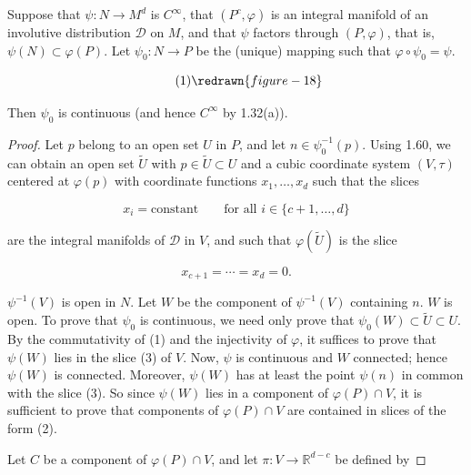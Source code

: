 \begin{theorem}\label{thm:1.62}
	Suppose that $\psi: N \to M^d$ is $C^\infty$, that $(P^c, \varphi)$ is an integral manifold of an involutive distribution $\mathcal{D}$ on $M$, and that $\psi$ factors through $(P, \varphi)$, that is, $\psi(N) \subset \varphi(P)$. Let $\psi_0: N \to P$ be the (unique) mapping such that $\varphi \circ \psi_0 = \psi$.

	\begin{equation}
		\tag{1}\label{eq:1.62:1}\redrawn{figure-18}
	\end{equation}

	Then  $ \psi_{0} $ is continuous (and hence  $ C^{\infty} $ by 1.32(a)).

\end{theorem}

\begin{proof}
	Let $p$ belong to an open set $U$ in $P$, and let $n\in\psi_0^{-1}(p)$. Using 1.60, we can obtain an open set $\tilde{U}$ with $p\in\tilde{U}\subset U$ and a cubic coordinate system $(V,\tau)$ centered at $\varphi(p)$ with coordinate functions $x_1,\ldots,x_d$ such that the slices

	\begin{equation}
		\tag{2}\label{eq:1.62:2}
		x_{i}=\mathrm{constant}\qquad\text{for all }i\in\{c+1,\ldots,d\}
	\end{equation}

	are the integral manifolds of $\mathcal{D}$ in $V$, and such that $\varphi(\tilde{U})$ is the slice

	\begin{equation}
		\tag{3}\label{eq:1.62:3}
		x_{c+1}=\cdots=x_{d}=0.
	\end{equation}

	$\psi^{-1}(V)$ is open in $N$. Let $W$ be the component of $\psi^{-1}(V)$ containing $n$. $W$ is open. To prove that $\psi_0$ is continuous, we need only prove that $\psi_0(W) \subset \tilde{U} \subset U$. By the commutativity of (1) and the injectivity of $\varphi$, it suffices to prove that $\psi(W)$ lies in the slice (3) of $V$. Now, $\psi$ is continuous and $W$ connected; hence $\psi(W)$ is connected. Moreover, $\psi(W)$ has at least the point $\psi(n)$ in common with the slice (3). So since $\psi(W)$ lies in a component of $\varphi(P) \cap V$, it is sufficient to prove that components of $\varphi(P) \cap V$ are contained in slices of the form (2).

	Let $C$ be a component of $\varphi(P) \cap V$, and let $\pi: V \to \mathbb{R}^{d-c}$ be defined by


\end{proof}
